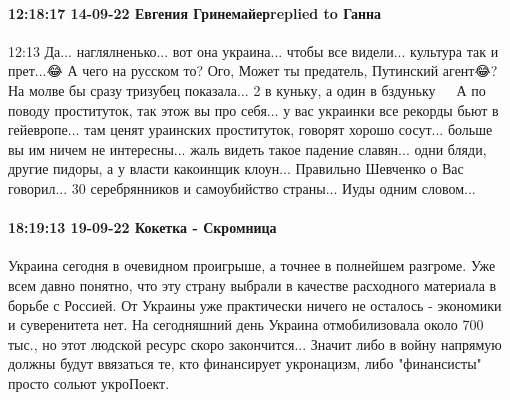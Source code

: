 \paragraph{12:18:17 14-09-22 Евгения Гринемайерreplied to Ганна}
12:13
Да... наглялненько... вот она украина... чтобы все видели... культура так и
прет...😂 А чего на русском то? Ого, Может ты предатель, Путинский агент😂? На
молве бы сразу тризубец показала... 2 в куньку, а один в бздуньку 🤣🤣🤣 А по
поводу проституток, так этож вы про себя... у вас украинки все рекорды бьют в
гейевропе... там ценят ураинских проституток, говорят хорошо сосут... больше вы
им ничем не интересны... жаль видеть такое падение славян... одни бляди, другие
пидоры, а у власти какоинщик клоун... Правильно Шевченко о Вас говорил... 30
серебрянников и самоубийство страны... Иуды одним словом...


\paragraph{18:19:13 19-09-22 Кокетка - Скромница}

Украина сегодня в очевидном проигрыше, а точнее в полнейшем разгроме. Уже всем давно понятно, что эту страну выбрали в качестве расходного материала в борьбе с Россией.
От Украины уже практически ничего не осталось - экономики и суверенитета нет.
На сегодняшний день Украина отмобилизовала около 700 тыс., но этот людской ресурс скоро закончится...
Значит либо в войну напрямую должны будут ввязаться те, кто финансирует укронацизм, либо "финансисты" просто сольют укроПоект.

